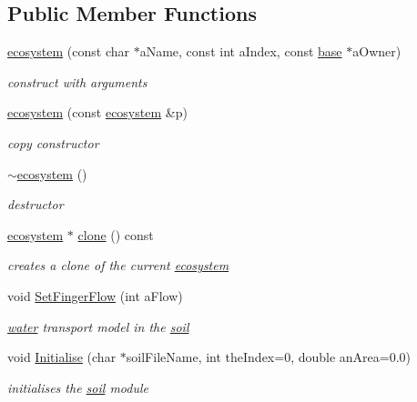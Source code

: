 \subsection*{Public Member Functions}
\begin{DoxyCompactItemize}
\item 
\hyperlink{classecosystem_a8e76a426eca95f2e287545e7e1ab745e}{ecosystem} (const char $\ast$aName, const int aIndex, const \hyperlink{classbase}{base} $\ast$aOwner)
\begin{DoxyCompactList}\small\item\em construct with arguments \item\end{DoxyCompactList}\item 
\hyperlink{classecosystem_a02e07277b33df4f149726d8cb91d1fcc}{ecosystem} (const \hyperlink{classecosystem}{ecosystem} \&p)
\begin{DoxyCompactList}\small\item\em copy constructor \item\end{DoxyCompactList}\item 
\hyperlink{classecosystem_a7d57023334e0fbdded2d5a02f1053015}{$\sim$ecosystem} ()
\begin{DoxyCompactList}\small\item\em destructor \item\end{DoxyCompactList}\item 
\hyperlink{classecosystem}{ecosystem} $\ast$ \hyperlink{classecosystem_a7d32ec71de4a7d66fb7edb4510a38f66}{clone} () const 
\begin{DoxyCompactList}\small\item\em creates a clone of the current \hyperlink{classecosystem}{ecosystem} \item\end{DoxyCompactList}\item 
void \hyperlink{classecosystem_a265f6108d61a5607dd0d46f679126fd1}{SetFingerFlow} (int aFlow)
\begin{DoxyCompactList}\small\item\em \hyperlink{classwater}{water} transport model in the \hyperlink{classsoil}{soil} \item\end{DoxyCompactList}\item 
void \hyperlink{classecosystem_aef0ef46a098200f4cf5b24b497508412}{Initialise} (char $\ast$soilFileName, int theIndex=0, double anArea=0.0)
\begin{DoxyCompactList}\small\item\em initialises the \hyperlink{classsoil}{soil} module \item\end{DoxyCompactList}\item 

\end{DoxyCompactItemize}
